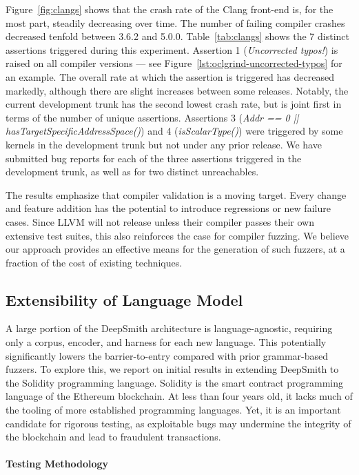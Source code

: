 Figure~\ref{fig:clangs} shows that the crash rate of the Clang front-end is, for
the most part, steadily decreasing over time. The number of failing compiler
crashes decreased tenfold between 3.6.2 and 5.0.0. Table~\ref{tab:clangs} shows
the 7 distinct assertions triggered during this experiment. Assertion 1
(\emph{Uncorrected typos!}) is raised on all compiler versions --- see
Figure~\ref{lst:oclgrind-uncorrected-typos} for an example. The overall rate at
which the assertion is triggered has decreased markedly, although there are
slight increases between some releases. Notably, the current development trunk
has the second lowest crash rate, but is joint first in terms of the number of
unique assertions. Assertions 3 (\emph{Addr == 0 ||
hasTargetSpecificAddressSpace()}) and 4 (\emph{isScalarType()}) were triggered
by some kernels in the development trunk but not under any prior release. We
have submitted bug reports for each of the three assertions triggered in the
development trunk, as well as for two distinct unreachables.

The results emphasize that compiler validation is a moving target. Every change
and feature addition has the potential to introduce regressions or new failure
cases. Since LLVM will not release unless their compiler passes their own
extensive test suites, this also reinforces the case for compiler fuzzing. We
believe our approach provides an effective means for the generation of such
fuzzers, at a fraction of the cost of existing techniques.


\subsection{Extensibility of Language Model}

A large portion of the DeepSmith architecture is language-agnostic, requiring
only a corpus, encoder, and harness for each new language. This potentially
significantly lowers the barrier-to-entry compared with prior grammar-based
fuzzers. To explore this, we report on initial results in extending DeepSmith to
the Solidity programming language.  Solidity is the smart contract programming
language of the Ethereum blockchain. At less than four years old, it lacks much
of the tooling of more established programming languages. Yet, it is an
important candidate for rigorous testing, as exploitable bugs may undermine the
integrity of the blockchain and lead to fraudulent transactions.

\paragraph{Testing Methodology}

